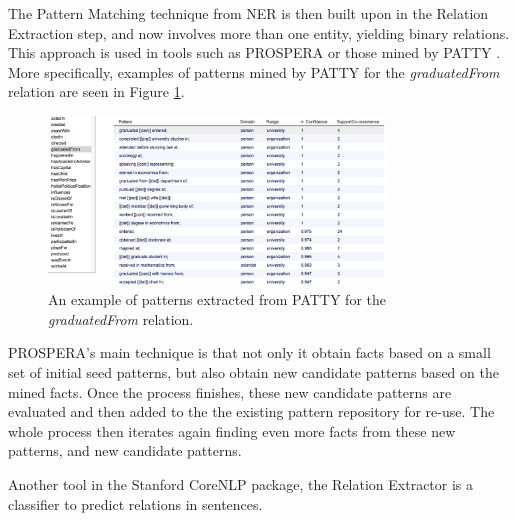 \documentclass[11pt,a4paper,openright]{memoir}
\begin{document}
The Pattern Matching technique from NER is then built upon in the Relation Extraction step, and now involves more than one entity, yielding binary relations. This approach is used in tools such as PROSPERA \cite{Nakashole:2011:SKH:1935826.1935869} or those mined by PATTY \cite{Nakashole:2012:PTR:2390948.2391076}. More specifically, examples of patterns mined by PATTY for the \emph{graduatedFrom} relation are seen in Figure \ref{fig:patty_examples}.

\begin{figure}[!htbp]
  \centering
    \includegraphics[width=0.8\textwidth]{./images/patty}
  \caption[An example of patterns extracted from PATTY.]{An example of patterns extracted from PATTY for the \emph{graduatedFrom} relation.}
  \label{fig:patty_examples}
\end{figure}

PROSPERA's main technique is that not only it obtain facts based on a small set of initial seed patterns, but also obtain new candidate patterns based on the mined facts. Once the process finishes, these new candidate patterns are evaluated and then added to the the existing pattern repository for re-use. The whole process then iterates again finding even more facts from these new patterns, and new candidate patterns.

Another tool in the Stanford CoreNLP package, the Relation Extractor \cite{Surdeanu:2011:CIE:2021153.2021155} is a classifier to predict relations in sentences.
\end{document}
